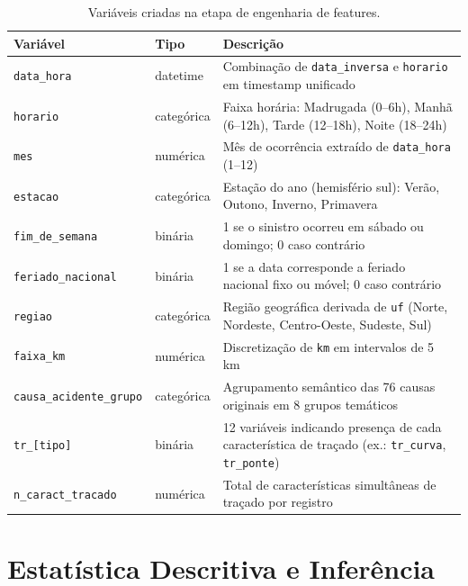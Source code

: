 \documentclass[12pt]{article}
\begin{document}
\begin{table}[ht]
\centering
\caption{Variáveis criadas na etapa de engenharia de features.}
\label{tab:features}
\small
\begin{tabular}{p{3.8cm} p{1.6cm} p{7.6cm}}
\toprule
\textbf{Variável} & \textbf{Tipo} & \textbf{Descrição} \\
\midrule
\texttt{data\_hora}
  & datetime
  & Combinação de \texttt{data\_inversa} e \texttt{horario}
    em timestamp unificado \\
\texttt{horario}
  & categórica
  & Faixa horária: Madrugada (0--6h), Manhã (6--12h),
    Tarde (12--18h), Noite (18--24h) \\
\texttt{mes}
  & numérica
  & Mês de ocorrência extraído de \texttt{data\_hora} (1--12) \\
\texttt{estacao}
  & categórica
  & Estação do ano (hemisfério sul): Verão, Outono,
    Inverno, Primavera \\
\texttt{fim\_de\_semana}
  & binária
  & 1 se o sinistro ocorreu em sábado ou domingo; 0 caso contrário \\
\texttt{feriado\_nacional}
  & binária
  & 1 se a data corresponde a feriado nacional fixo ou móvel;
    0 caso contrário \\
\texttt{regiao}
  & categórica
  & Região geográfica derivada de \texttt{uf}
    (Norte, Nordeste, Centro-Oeste, Sudeste, Sul) \\
\texttt{faixa\_km}
  & numérica
  & Discretização de \texttt{km} em intervalos de 5 km \\
\texttt{causa\_acidente\_grupo}
  & categórica
  & Agrupamento semântico das 76 causas originais
    em 8 grupos temáticos \\
\texttt{tr\_[tipo]}
  & binária
  & 12 variáveis indicando presença de cada característica
    de traçado (ex.: \texttt{tr\_curva}, \texttt{tr\_ponte}) \\
\texttt{n\_caract\_tracado}
  & numérica
  & Total de características simultâneas de traçado por registro \\
\bottomrule
\end{tabular}
\end{table}


\section{Estatística Descritiva e Inferência}
\end{document}
